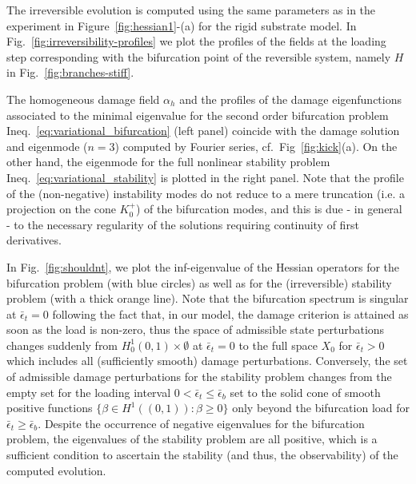 The irreversible evolution is computed using the same parameters as in the experiment in Figure~\ref{fig:hessian1}-(a) for the rigid substrate model. In Fig.~\ref{fig:irreversibility-profiles} we plot the profiles of the fields at the loading step corresponding with the bifurcation point of the reversible system, namely $H$ in Fig.~\ref{fig:branches-stiff}.


The homogeneous damage field $\alpha_h$ and the profiles of the damage eigenfunctions associated to the minimal eigenvalue for the second order bifurcation problem Ineq.~\eqref{eq:variational_bifurcation} (left panel) coincide with the damage solution and eigenmode ($n=3$) computed by Fourier series, {cf.~Fig~\ref{fig:kick}(a).}
On the other hand, the eigenmode for the full nonlinear stability problem Ineq.~\eqref{eq:variational_stability} is plotted in the right panel.
Note that the profile of the (non-negative) instability modes do not reduce to a mere truncation (i.e. a projection on the cone $K^+_0$) of the bifurcation modes, and this is due - in general - to the necessary regularity of the solutions requiring continuity of first derivatives. 


In Fig.~\ref{fig:shouldnt}, we plot the inf-eigenvalue of the Hessian operators for the bifurcation problem (with blue circles) as well as for the (irreversible) stability problem (with a thick orange line). 
Note that the bifurcation spectrum is singular at $\bar \epsilon_t=0$ following the fact that, in our model, the damage criterion is attained as soon as the load is non-zero, thus the space of admissible state perturbations changes suddenly from $H^1_0(0,1) \times \emptyset$ at $\bar \epsilon_t=0$ to the full space $X_0$ for $\bar \epsilon_t>0$ which includes all (sufficiently smooth) damage perturbations. 
Conversely, the set of admissible damage perturbations for the stability problem changes from the empty set for the loading interval $0 < \bar\epsilon_t\leq \bar\epsilon_b$ set to the solid cone of smooth positive functions $\{\beta\in H^1((0,1)):\beta \geq 0\}$ only beyond the bifurcation load for $\bar\epsilon_t \geq \bar\epsilon_b$.
Despite the occurrence of negative eigenvalues for the bifurcation problem, the eigenvalues of the stability problem are all positive, which is a sufficient condition to ascertain the stability (and thus, the observability) of the computed evolution.

